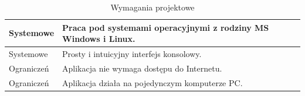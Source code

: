 \documentclass[../thesis.tex]{subfiles}
\begin{document}
\begin{table}[h]
\begin{center}
\begin{tabular}{ | l | p{110mm} | }
Systemowe & Praca pod systemami operacyjnymi z rodziny MS Windows i Linux. \\\hline
Systemowe & Prosty i intuicyjny interfejs konsolowy. \\\hline 

Ograniczeń & Aplikacja nie wymaga dostępu do Internetu. \\\hline
Ograniczeń & Aplikacja działa na pojedynczym komputerze PC. \\\hline

\end{tabular}
\caption{Wymagania projektowe}
\label{req:table}
\end{center}
\end{table}
\end{document}
